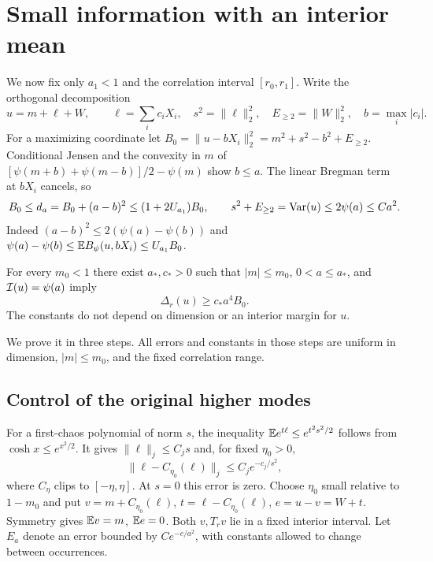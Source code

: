 \section{Small information with an interior mean}\label{sec:small}
We now fix only $a_1<1$ and the correlation interval $[r_0,r_1]$.
Write the orthogonal decomposition
\[
 u=m+\ell+W,\qquad \ell=\sum_i c_iX_i,\quad
 s^2=\|\ell\|_2^2,\quad E_{\ge2}=\|W\|_2^2,
 \quad b=\max_i|c_i|.
\]
For a maximizing coordinate let
$B_0=\|u-bX_i\|_2^2=m^2+s^2-b^2+E_{\ge2}$.
Conditional Jensen and the convexity in $m$ of
$[\psi(m+b)+\psi(m-b)]/2-\psi(m)$ show $b\le a$.
The linear Bregman term at $bX_i$ cancels, so
\begin{equation}\label{eq:modal}
 B_0\le d_a=B_0+(a-b)^2\le(1+2U_{a_1})B_0,
 \qquad s^2+E_{\ge2}=\operatorname{Var}(u)\le2\psi(a)\le C a^2.
\end{equation}
Indeed $(a-b)^2\le2(\psi(a)-\psi(b))$ and
$\psi(a)-\psi(b)\le\mathbb E B_\psi(u,bX_i)\le U_{a_1}B_0$.

\begin{proposition}\label{prop:interiormean}
For every $m_0<1$ there exist $a_*,c_*>0$ such that
$|m|\le m_0$, $0<a\le a_*$, and $\mathcal I(u)=\psi(a)$ imply
\[
 \Delta_r(u)\ge c_* a^4 B_0.
\]
The constants do not depend on dimension or an interior margin for $u$.
\end{proposition}
We prove it in three steps. All errors and constants in those steps
are uniform in dimension, $|m|\le m_0$, and the fixed correlation range.

\subsection{Control of the original higher modes}
For a first-chaos polynomial of norm $s$, the inequality
$\mathbb E e^{t\ell}\le e^{t^2s^2/2}$ follows from $\cosh x\le e^{x^2/2}$.
It gives $\|\ell\|_j\le C_js$ and, for fixed $\eta_0>0$,
\begin{equation}\label{eq:cliptail}
 \|\ell-C_{\eta_0}(\ell)\|_j\le C_j e^{-c_j/s^2},
\end{equation}
where $C_\eta$ clips to $[-\eta,\eta]$. At $s=0$ this error is zero.
Choose $\eta_0$ small relative to $1-m_0$ and put
$v=m+C_{\eta_0}(\ell)$, $t=\ell-C_{\eta_0}(\ell)$,
$e=u-v=W+t$. Symmetry gives $\mathbb E v=m$, $\mathbb E e=0$.
Both $v,T_rv$ lie in a fixed interior interval.
Let $E_a$ denote an error bounded by $Ce^{-c/a^2}$, with constants
allowed to change between occurrences.

